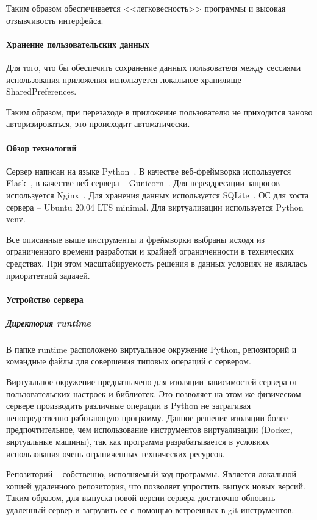 \documentclass[explnote]{espd}
\begin{document}
Таким образом обеспечивается <<легковесность>> программы и высокая отзывчивость интерфейса.

\paragraph{Хранение пользовательских данных}
Для того, что бы обеспечить сохранение данных пользователя между сессиями использования приложения используется локальное хранилище SharedPreferences.

Таким образом, при перезаходе в приложение пользователю не приходится заново авторизироваться, это происходит автоматически. 

\paragraph{Обзор технологий}
Сервер написан на языке Python~\cite{python}. В качестве веб-фреймворка используется Flask~\cite{flask}, в качестве веб-сервера -- Gunicorn~\cite{gunicorn}. Для переадресации запросов используется Nginx~\cite{nginx}. Для хранения данных используется SQLite~\cite{sqlite}. ОС для хоста сервера -- Ubuntu 20.04 LTS minimal. Для виртуализации используется Python venv.

Все описанные выше инструменты и фреймворки выбраны исходя из ограниченного времени разработки и крайней ограниченности в технических средствах. При этом масштабируемость решения в данных условиях не являлась приоритетной задачей.

\paragraph{Устройство сервера}
\subparagraph{Директория runtime}
В папке runtime расположено виртуальное окружение Python, репозиторий и командные файлы для совершения типовых операций с сервером.

Виртуальное окружение предназначено для изоляции зависимостей сервера от пользовательских настроек и библиотек. Это позволяет на этом же физическом сервере производить различные операции в Python не затрагивая непосредственно работающую программу. Данное решение изоляции более предпочтительное, чем использование инструментов виртуализации (Docker, виртуальные машины), так как программа разрабатывается в условиях использования очень ограниченных технических ресурсов.

Репозиторий -- собственно, исполняемый код программы. Является локальной копией удаленного репозитория, что позволяет упростить выпуск новых версий. Таким образом, для выпуска новой версии сервера достаточно обновить удаленный сервер и загрузить ее с помощью встроенных в git инструментов.
\end{document}

